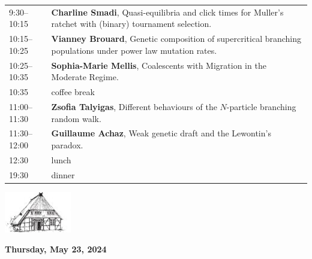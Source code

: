 \documentclass[12pt,a4paper]{article}
\newcommand{\Kopf}{%
\begin{center}%
\includegraphics[width=.2\textwidth]{logo-tsh}\\[2ex]
\end{center}
}
\begin{document}
\begin{tabular}{@{}l p{}@{}}
%
9:30--10:15 &  \textbf{Charline Smadi}, 
                Quasi-equilibria and click times for Muller’s ratchet with (binary) tournament selection. \\ 
10:15--10:25 & \textbf{Vianney Brouard}, 
                Genetic composition of supercritical branching populations under power law mutation rates. \\          
10:25--10:35 &  \textbf{Sophia-Marie Mellis},
                Coalescents with Migration in the Moderate Regime. \\ 
10:35 & coffee break  \\  
11:00--11:30 &  \textbf{Zsofia Talyigas}, 
                Different behaviours of the $N$-particle branching random walk. \\
11:30--12:00 &  \textbf{Guillaume Achaz}, 
                Weak genetic draft and the Lewontin’s paradox.\\
12:30 & lunch  \\  
19:30 & dinner
\end{tabular}

\newpage

\Kopf
\vspace*{.75cm}

\textbf{\Large Thursday, May 23, 2024}\medskip
\end{document}
